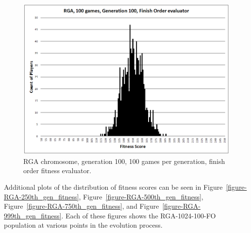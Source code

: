 \begin{figure}[htp]
\centerline{\includegraphics[width=0.75\columnwidth]{Figures/RGA_1024_G100_N100_FO.png}}
\caption[RGA Fitness Distribution, 100th Generation]{RGA chromosome, generation
100, 100 games per generation, finish order fitness evaluator.}
\label{figure-100th_gen_fitness}
\end{figure}

Additional plots of the distribution of fitness scores can be seen in
Figure~\ref{figure-RGA-250th_gen_fitness},
Figure~\ref{figure-RGA-500th_gen_fitness},
Figure~\ref{figure-RGA-750th_gen_fitness}, and
Figure~\ref{figure-RGA-999th_gen_fitness}. Each of these figures shows the
RGA-1024-100-FO population at various points in the evolution process. 

